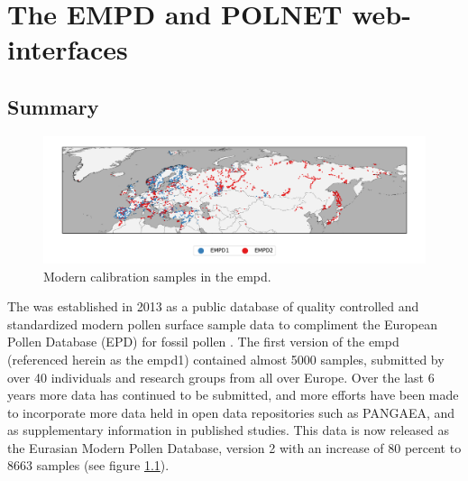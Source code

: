 
\chapter{The EMPD and POLNET web-interfaces}

\label{chp:empd}

\begin{refsection}

\section{Summary}\label{sec:empd-summary}

\begin{figure}
	\includegraphics[width=\linewidth]{empd-figures/empd-sites.pdf}
	\caption[Modern calibration samples in the EMPD]{Modern calibration samples in the \gls{empd}.}
	\label{fig:empd-sites}
\end{figure}

The  was established in 2013 as a public database of quality controlled and standardized modern pollen surface sample data to compliment the European Pollen Database (EPD) for fossil pollen \citep{DavisZanonCollinsEtAl2013}. The first version of the \gls{empd} (referenced herein as the \gls{empd}1) contained almost 5000 samples, submitted by over 40 individuals and research groups from all over Europe. Over the last 6 years more data has continued to be submitted, and more efforts have been made to incorporate more data held in open data repositories such as PANGAEA, and as supplementary information in published studies. This data is now released as the Eurasian Modern Pollen Database, version 2 \citep{DavisChevalierSommerEtAlinprep} with an increase of 80 percent to 8663 samples (see figure \ref{fig:empd-sites}).


\end{refsection}
